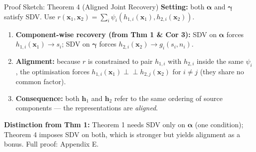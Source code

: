 \documentclass[aspectratio=169, 10pt]{beamer}
\begin{document}
\begin{frame}{Proof Sketch: Theorem 4 (Aligned Joint Recovery)}
  \textbf{Setting:} both $\boldsymbol{\alpha}$ and $\boldsymbol{\gamma}$ satisfy SDV.
  Use $r(\mathbf{x}_1,\mathbf{x}_2)=\sum_i\psi_i(h_{1,i}(\mathbf{x}_1),h_{2,i}(\mathbf{x}_2))$.

  \medskip
  \begin{enumerate}
    \item \textbf{Component-wise recovery (from Thm 1 \& Cor 3):}
          SDV on $\boldsymbol{\alpha}$ forces $h_{1,i}(\mathbf{x}_1)\to s_i$;
          SDV on $\boldsymbol{\gamma}$ forces $h_{2,i}(\mathbf{x}_2)\to g_i(s_i,n_i)$.
    \item \textbf{Alignment:} because $r$ is constrained to pair
          $h_{1,i}$ with $h_{2,i}$ inside the same $\psi_i$, the optimisation
          forces $h_{1,i}(\mathbf{x}_1)\perp\!\!\!\perp h_{2,j}(\mathbf{x}_2)$ for
          $i\neq j$ (they share no common factor).
    \item \textbf{Consequence:} both $\mathbf{h}_1$ and $\mathbf{h}_2$ refer to the
          same ordering of source components — the representations are \emph{aligned}.
  \end{enumerate}

  \medskip
  \textbf{Distinction from Thm 1:} Theorem 1 needs SDV only on $\boldsymbol{\alpha}$
  (one condition); Theorem 4 imposes SDV on both, which is stronger but yields
  alignment as a bonus. Full proof: Appendix E.
\end{frame}
\end{document}
